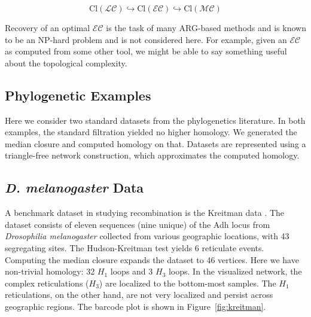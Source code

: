 \begin{equation}
 \mathrm{Cl}(\mathcal{LC}) \hookrightarrow \mathrm{Cl}(\mathcal{EC}) \hookrightarrow \mathrm{Cl}(\mathcal{MC})
\end{equation}

Recovery of an optimal $\mathcal{EC}$ is the task of many ARG-based methods and is known to be an NP-hard problem and is not considered here.
For example, given an $\mathcal{EC}$ as computed from some other tool, we might be able to say something useful about the topological complexity.

\subsection{Phylogenetic Examples}

Here we consider two standard datasets from the phylogenetics literature.
In both examples, the standard filtration yielded no higher homology.
We generated the median closure and computed homology on that.
Datasets are represented using a triangle-free network construction, which approximates the computed homology.

\subsection{{\textit{D. melanogaster}} Data}

A benchmark dataset in studying recombination is the Kreitman data \cite{Kreitman:1983}.
The dataset consists of eleven sequences (nine unique) of the Adh locus from \emph{Drosophilia melanogaster} collected from various geographic locations, with 43 segregating sites.
The Hudson-Kreitman test yields 6 reticulate events.
Computing the median closure expands the dataset to 46 vertices.
Here we have non-trivial homology: 32 $H_1$ loops and 3 $H_3$ loops.
In the visualized network, the complex reticulations ($H_3$) are localized to the bottom-most samples.
The $H_1$ reticulations, on the other hand, are not very localized and persist across geographic regions.
The barcode plot is shown in Figure~\ref{fig:kreitman}.

